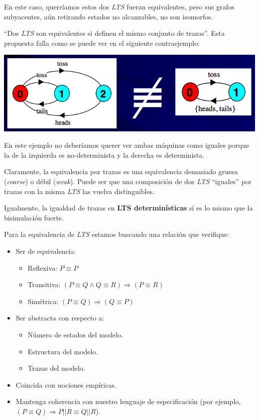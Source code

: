 \documentclass[]{article}
\begin{document}
En este caso, querríamos estos dos \textit{LTS} fueran equivalentes, pero sus grafos subyacentes, aún retirando estados no alcanzables, no son isomorfos.


\label{trazfail}
``Dos \textit{LTS} son equivalentes si definen el mismo conjunto de trazas''. Esta propuesta falla como se puede ver en el siguiente contraejemplo:
\begin{center}
	\includegraphics[scale=0.5]{TrazFail.png}
\end{center}

En este ejemplo no deberíamos querer ver ambas máquinas como iguales porque la de la izquierda es no-determinista y la derecha es determinista.


Claramente, la equivalencia por trazas es una equivalencia demasiado gruesa (\textit{coarse}) o débil (\textit{weak}). Puede ser que una composición de dos \textit{LTS} ``iguales'' por trazas con la misma \textit{LTS} las vuelva distinguibles.

Igualmente, la igualdad de trazas en \textbf{LTS determinísticas} sí es lo mismo que la bisimulación fuerte.


Para la equivalencia de \textit{LTS} estamos buscando una relación que verifique:
\begin{itemize}
	\item Ser de equivalencia:
	\begin{itemize}
		\item Reflexiva: $P \equiv P$
		\item Transitiva: $(P \equiv Q \wedge Q \equiv R) \Rightarrow (P \equiv R)$
		\item Simétrica: $(P \equiv Q) \Rightarrow (Q \equiv P)$
	\end{itemize}
	\item Ser abstracta con respecto a:
	\begin{itemize}
		\item Número de estados del modelo.
		\item Estructura del modelo.
		\item Trazas del modelo.
	\end{itemize}
	\item Coincida con nociones empíricas.
	\item Mantenga coherencia con nuestro lenguaje de especificación (por ejemplo, $(P \equiv Q) \Rightarrow P||R \equiv Q||R$).
\end{itemize}
\end{document}

